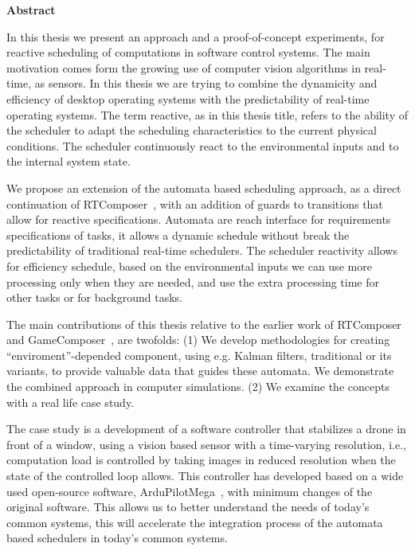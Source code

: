 \documentclass[../hodai_thesis.tex]{subfiles}
\begin{document}
\begin{center}
\LARGE \textbf{Abstract}
\end{center}

    In this thesis we present an approach and a proof-of-concept experiments, for reactive scheduling of computations in software control systems. The main motivation comes form the growing use of computer vision algorithms in real-time, as sensors.
    In this thesis we are trying to combine the dynamicity and efficiency of desktop operating systems with the predictability of real-time operating systems.
    The term reactive, as in this thesis title, refers to the ability of the scheduler to adapt the scheduling characteristics to the current physical conditions. The scheduler continuously react to the environmental inputs and to the internal system state. 
    
    We propose an extension of the automata based scheduling approach, as a direct continuation of RTComposer~\cite{RTComposer}, with an addition of guards to transitions that allow for reactive specifications. 
    Automata are reach interface for requirements specifications of tasks, it allows a dynamic schedule without break the predictability of traditional real-time schedulers.
    The scheduler reactivity allows for efficiency schedule, based on the environmental inputs we can use more processing only when they are needed, and use the extra processing time for other tasks or for background tasks.
    
    The main contributions of this thesis relative to the earlier work of RTComposer~\cite{RTComposer} and GameComposer~\cite{Merav}, are twofolds: (1) We develop methodologies for creating ``enviroment''-depended component, using e.g. Kalman filters, traditional or its variants, to provide valuable data that guides these automata. We demonstrate the combined approach in computer simulations. 
    (2) We examine the concepts with a real life case study.
    
    The case study is a development of a software controller that stabilizes a drone in front of a window, using a vision based sensor with a time-varying resolution, i.e., computation load is controlled by taking images in reduced resolution when the state of the controlled loop allows.
    This controller has developed based on a wide used open-source software, ArduPilotMega~\cite{APM}, with minimum changes of the original software. This allows us to better understand the needs of today's common systems, this will accelerate the integration process of the automata based schedulers in today's common systems. 
\end{document}
